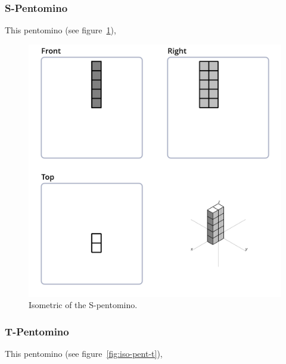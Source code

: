 \subsubsection{S-Pentomino}
\label{sec:s-pentomino}
This pentomino (see figure~\ref{fig:iso-pent-s}),


\begin{figure}
	\centering
	\includegraphics[scale=0.3]{iso_diagrams/o.png}
	\caption{Isometric of the S-pentomino.}
  \label{fig:iso-pent-s}
\end{figure}

\subsubsection{T-Pentomino}
\label{sec:t-pentomino}
This pentomino (see figure~\ref{fig:iso-pent-t}),


